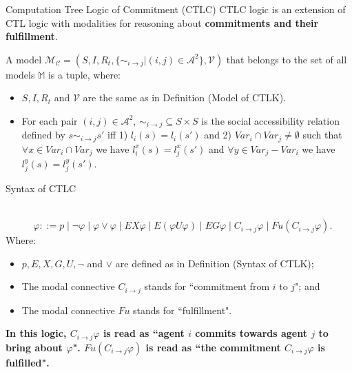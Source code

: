 \documentclass{beamer}
\begin{document}
\begin{frame}{Computation Tree Logic of Commitment (CTLC)}
CTLC logic is an extension of CTL logic with modalities for reasoning about \textbf{commitments and their fulfillment}.
\begin{definition} \label{Model of CTLC}
A model $\mathcal{M_C}=(S,I,R_t, \{\sim _{i \rightarrow j}|{(i,j)\in \mathcal{A}^2}\},\mathcal{V})$ that belongs to the set of all models $\mathbb{M}$ is a tuple, where:
\begin {itemize}
\item $S, I, R_t$ and $\mathcal{V}$ are the same as in Definition (Model of CTLK).
\item For each pair $(i, j) \in \mathcal{A}^2 $, $\sim _{i \rightarrow j} \subseteq S \times S $ is the social accessibility relation defined by $ s \sim _{i \rightarrow j} s' $ iff
     1) $ l_i(s) = l_i(s') $ and 2) $ Var_i \cap Var_j \neq \emptyset $ such that  $ \forall x \in Var_i \cap Var_j $ we have $ l_i^x(s) = l_j^x(s') $ and $ \forall y \in Var_j - Var_i $ we have $ l_j^y(s) = l_j^y(s')$.

\end {itemize}
\label {dfn: Model of CTLC}
\end{definition}
\end{frame}
\begin{frame} {Syntax of CTLC}
\begin{definition}~\\
$ ~~~~~~~~~~~~~\varphi ::= p \mid \neg \varphi \mid \varphi \vee
\varphi \mid EX \varphi  \mid E ( \varphi U \varphi) \mid EG
\varphi \mid C_{i\rightarrow j} \varphi \mid Fu (C_{i\rightarrow
j}\varphi)$.
\label {dfn: Syntax of CTLC}\\
Where:
\begin{itemize}
  \item $ p, E, X, G, U, \neg $ and $\vee$ are defined as in Definition (Syntax of CTLK);
  \item The modal connective $C_{i \rightarrow j}$ stands for ``commitment from $i$ to $j$"; and
  \item The modal connective $Fu$ stands for ``fulfillment".
\end{itemize}
\end{definition}
\textbf{In this logic, $C_{i\rightarrow j}\varphi$ is read as ``agent $i$ commits towards agent $j$ to bring about $\varphi$". $Fu (C_{i\rightarrow j}\varphi)$ is read as ``the commitment $C_{i\rightarrow j}\varphi$ is fulfilled".}
\end{frame}
\end{document}
